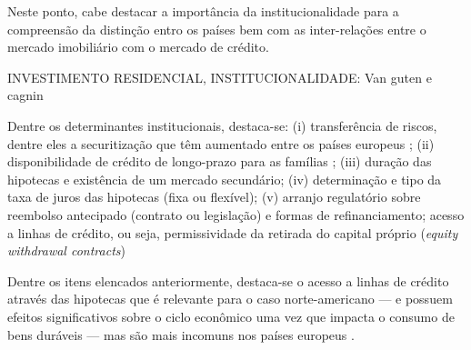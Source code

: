Neste ponto, cabe destacar a importância da institucionalidade para a compreensão da distinção entro os países bem com as inter-relações entre o mercado imobiliário com o mercado de crédito.

INVESTIMENTO RESIDENCIAL, INSTITUCIONALIDADE: Van guten e cagnin

Dentre os determinantes institucionais, destaca-se: (i) transferência de riscos, dentre eles a securitização que têm aumentado entre os países europeus \cite{european_central_bank_housing_2010}; (ii) disponibilidade de crédito de longo-prazo para as famílias \cite{schwartz_politics_2009}; (iii) duração das hipotecas e existência de um mercado secundário; (iv) determinação  e tipo da taxa de juros das hipotecas (fixa ou flexível); (v) arranjo regulatório sobre reembolso antecipado (contrato ou legislação) e formas de refinanciamento; acesso a linhas de crédito, ou seja, permissividade da retirada do capital próprio (\textit{equity withdrawal contracts})

Dentre os itens elencados anteriormente, destaca-se o acesso a linhas de crédito através das hipotecas que é relevante para o caso norte-americano \cite{cagnin_o_2009} --- e possuem efeitos significativos sobre o ciclo econômico uma vez que impacta o consumo de bens duráveis \cite{leamer_housing_2007} --- mas são mais incomuns nos países europeus \cite[p.~95]{van_gunten_varieties_2018}.

